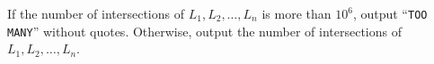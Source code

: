 If the number of intersections of $L_1,L_2,\dots,L_n$ is more than $10^6$,
output ``\verb+TOO MANY+'' without quotes. Otherwise, output the number 
of intersections of $L_1,L_2,\dots,L_n$.
